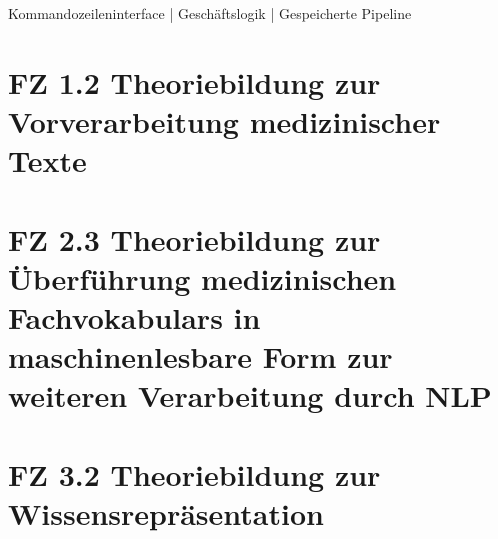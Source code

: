 Kommandozeileninterface
        |
Geschäftslogik
        |
Gespeicherte Pipeline


\section{FZ 1.2 Theoriebildung zur Vorverarbeitung medizinischer Texte}
\label{sec:FZ1.2} 

\section{FZ 2.3 Theoriebildung zur Überführung medizinischen Fachvokabulars in maschinenlesbare Form zur weiteren Verarbeitung durch NLP}
\label{sec:FZ2.3} 

\section{FZ 3.2 Theoriebildung zur Wissensrepräsentation}
\label{sec:FZ3.2} 
